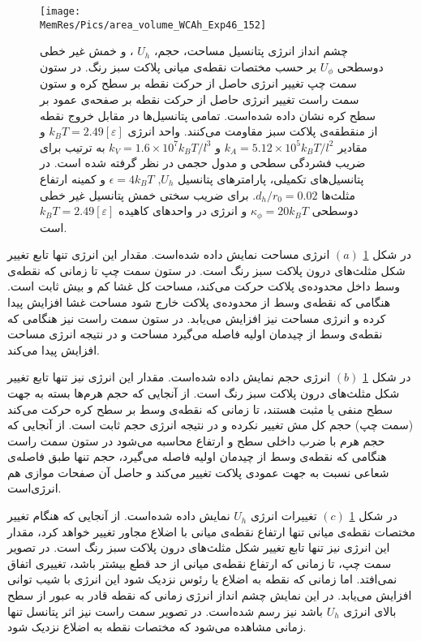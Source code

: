 \begin{figure}[htbp]
\begin{center}
\texttt{[image: \\MemRes/Pics/area\_volume\_WCAh\_Exp46\_152]}
\caption{
چشم انداز انرژی پتانسیل مساحت، حجم،
$U_h$
، و خمش غیر خطی دوسطحی
$U_\phi$
 بر حسب مختصات نقطه‌ی میانی پلاکت سبز رنگ. در ستون سمت چپ تغییر انرژی حاصل از حرکت نقطه بر سطح کره و ستون سمت راست تغییر انرژی حاصل از حرکت نقطه بر صفحه‌ی عمود بر سطح کره  نشان داده شده‌است. تمامی پتانسیل‌ها در مقابل خروج نقطه از منقطقه‌ی پلاکت سبز مقاومت می‌کنند. واحد انرژی
$k_BT=2.49[\varepsilon]$
 و مقادیر 
 $k_A=5.12\times10^5k_BT/l^2$
 و
 $k_V=1.6\times10^7k_BT/l^3$
 به ترتیب برای ضریب فشردگی سطحی و مدول حجمی در نظر گرفته شده است. در پتانسیل‌های تکمیلی، پارامتر‌های پتانسیل 
 $U_h$, $\epsilon=4k_BT$
 و کمینه ارتفاع مثلث‌ها 
 $d_h/r_0=0.02$.
 برای ضریب سختی خمش پتانسیل غیر خطی دوسطحی 
 $\kappa_{\phi}=20k_BT$
 و انرژی در واحد‌های کاهیده
 $k_BT=2.49[\varepsilon]$
 است.
}
\label{fig:PlacketEnergyArea}
\end{center}
\end{figure}

در شکل 
\ref{fig:PlacketEnergyArea} $(a)$
 انرژی مساحت نمایش داده شده‌است. مقدار این انرژی تنها تابع تغییر شکل مثلث‌های درون پلاکت سبز رنگ است. در ستون سمت چپ تا زمانی که نقطه‌ی وسط داخل محدوده‌ی پلاکت حرکت می‌کند، مساحت کل غشا کم و بیش ثابت است. هنگامی‌ که نقطه‌ی وسط از محدوده‌ی پلاکت خارج شود مساحت غشا افزایش پیدا کرده و انرژی مساحت نیز افزایش می‌یابد. در ستون سمت راست نیز هنگامی که نقطه‌ی وسط از چیدمان اولیه فاصله می‌گیرد مساحت و در نتیجه انرژی مساحت افزایش پیدا می‌کند. 

در شکل 
\ref{fig:PlacketEnergyArea} $(b)$
 انرژی حجم نمایش داده شده‌است. مقدار این انرژی نیز تنها تابع تغییر شکل مثلث‌های درون پلاکت سبز رنگ است. از آنجایی که حجم هرم‌ها بسته به جهت سطح منفی یا مثبت هستند، تا زمانی که نقطه‌ی وسط بر سطح کره حرکت می‌کند (سمت چپ) حجم کل مش تغییر نکرده و در نتیجه انرژی حجم ثابت است.‌ از آنجایی که حجم هرم با ضرب داخلی سطح و ارتفاع محاسبه می‌شود در ستون سمت راست  هنگامی که نقطه‌ی وسط از چیدمان اولیه فاصله می‌گیرد، حجم تنها طبق فاصله‌ی شعاعی نسبت به جهت عمودی پلاکت تغییر می‌کند و حاصل آن صفحات موازی هم انرژی‌است.

در شکل 
\ref{fig:PlacketEnergyArea} $(c)$
تغییرات انرژی 
$U_h$
 نمایش داده شده‌است. از آنجایی که هنگام تغییر مختصات نقطه‌ی میانی تنها ارتفاع نقطه‌ی میانی با اضلاع مجاور تغییر خواهد کرد، مقدار این انرژی نیز تنها تابع تغییر شکل مثلث‌های درون پلاکت سبز رنگ است. در تصویر سمت چپ، تا زمانی که ارتفاع نقطه‌ی میانی از حد قطع بیشتر باشد، تغییری اتفاق نمی‌افتد. اما زمانی که نقطه به اضلاع یا رئوس نزدیک شود این انرژی با شیب توانی افزایش می‌یابد. در این نمایش چشم انداز انرژی زمانی که نقطه قادر به عبور از سطح بالای انرژی 
 $U_h$
 باشد نیز رسم شده‌است. در تصویر سمت راست نیز اثر پتانسل تنها زمانی مشاهده می‌شود که مختصات نقطه به اضلاع نزدیک شود.
 
